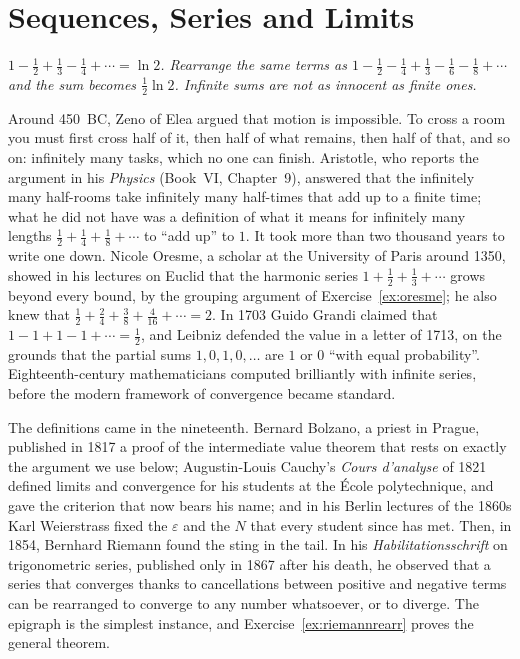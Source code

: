 \chapter{Sequences, Series and Limits}\label{ch:sequences}

\begin{center}\itshape
$1-\frac12+\frac13-\frac14+\cdots=\ln2$. Rearrange the same terms as $1-\frac12-\frac14+\frac13-\frac16-\frac18+\cdots$\\
and the sum becomes $\frac12\ln2$. Infinite sums are not as innocent as finite ones.
\end{center}

Around 450~BC, Zeno of Elea argued that motion is impossible. To cross a room you must first cross half of it, then half of what remains, then half
of that, and so on: infinitely many tasks, which no one can finish. Aristotle, who reports the argument in his \emph{Physics} (Book~VI, Chapter~9), answered that
the infinitely many half-rooms take infinitely many half-times that add up to a finite time; what he did not have was a definition of what it means
for infinitely many lengths $\frac12+\frac14+\frac18+\cdots$ to ``add up'' to $1$. It took more than two thousand years to write one down. Nicole
Oresme, a scholar at the University of Paris around 1350, showed in his lectures on Euclid that the harmonic series $1+\frac12+\frac13+\cdots$ grows
beyond every bound, by the grouping argument of Exercise~\ref{ex:oresme}; he also knew that $\frac12+\frac24+\frac38+\frac4{16}+\cdots=2$. In 1703 Guido Grandi
claimed that $1-1+1-1+\cdots=\frac12$, and Leibniz defended the value in a letter of 1713, on the grounds that the partial sums $1,0,1,0,\dots$ are
$1$ or $0$ ``with equal probability''. Eighteenth-century mathematicians computed brilliantly with infinite series, before the modern framework of convergence became standard.

The definitions came in the nineteenth. Bernard Bolzano, a priest in Prague, published in 1817 a proof of the intermediate value theorem that
rests on exactly the argument we use below; Augustin-Louis Cauchy's \emph{Cours d'analyse} of 1821 defined limits and convergence for his students at
the \'Ecole polytechnique, and gave the criterion that now bears his name; and in his Berlin lectures of the 1860s Karl Weierstrass fixed the
$\varepsilon$ and the $N$ that every student since has met. Then, in 1854, Bernhard Riemann found the sting in the tail. In his
\emph{Habilitationsschrift} on trigonometric series, published only in 1867 after his death, he observed that a series that converges thanks to
cancellations between positive and negative terms can be rearranged to converge to any number whatsoever, or to diverge. The epigraph is the
simplest instance, and Exercise~\ref{ex:riemannrearr} proves the general theorem.

